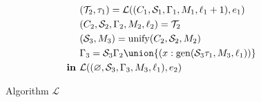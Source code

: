 \begin{figure}[H]
{\begin{minipage}[c][\textheight-2\fboxsep-2\fboxrule-1cm][c]{\dimexpr\textwidth-2\fboxsep-2\fboxrule}
\begin{alignat*}{4}
      & && & &(\mathcal{T}_2, \tau_1) = \mathcal{L}((C_1, \mathcal{S}_1, \Gamma_1, M_1, \ell_1 + 1), e_1)\\
      & && & &(C_2, \mathcal{S}_2, \Gamma_2, M_2, \ell_2) = \mathcal{T}_2\\
      & && & &(\mathcal{S}_3, M_3) = \mathrm{unify}(C_2, \mathcal{S}_2, M_2)\\
      & && & &\Gamma_3 = \mathcal{S}_3\Gamma_2 \union \{(x:\mathrm{gen}(\mathcal{S}_3 \tau_1, M_3, \ell_1))\}\\
      & && &\textbf{in } &\mathcal{L}((\varnothing, \mathcal{S}_3, \Gamma_3, M_3, \ell_1), e_2) \\
    \end{alignat*}
  \end{minipage}}
  \caption{Algorithm $\mathcal{L}$}\label{fig:algorithm-L}
\end{figure}
